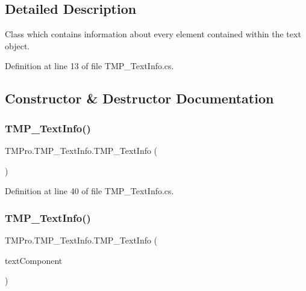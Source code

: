 \subsection{Detailed Description}
Class which contains information about every element contained within the text object. 



Definition at line 13 of file T\+M\+P\+\_\+\+Text\+Info.\+cs.



\subsection{Constructor \& Destructor Documentation}
\mbox{\label{class_t_m_pro_1_1_t_m_p___text_info_a3311c0c2844d83db91e01c3c2237cfb4}} 
\subsubsection{\texorpdfstring{TMP\_TextInfo()}{TMP\_TextInfo()}\hspace{0.1cm}{\footnotesize\ttfamily [1/2]}}
{\footnotesize\ttfamily T\+M\+Pro.\+T\+M\+P\+\_\+\+Text\+Info.\+T\+M\+P\+\_\+\+Text\+Info (\begin{DoxyParamCaption}{ }\end{DoxyParamCaption})}



Definition at line 40 of file T\+M\+P\+\_\+\+Text\+Info.\+cs.

\mbox{\label{class_t_m_pro_1_1_t_m_p___text_info_a73cb6b530a8da8d58248b4dcacc5ee7c}} 
\subsubsection{\texorpdfstring{TMP\_TextInfo()}{TMP\_TextInfo()}\hspace{0.1cm}{\footnotesize\ttfamily [2/2]}}
{\footnotesize\ttfamily T\+M\+Pro.\+T\+M\+P\+\_\+\+Text\+Info.\+T\+M\+P\+\_\+\+Text\+Info (\begin{DoxyParamCaption}\item[{\mbox{\hyperlink{class_t_m_pro_1_1_t_m_p___text}{T\+M\+P\+\_\+\+Text}}}]{text\+Component }\end{DoxyParamCaption})}



